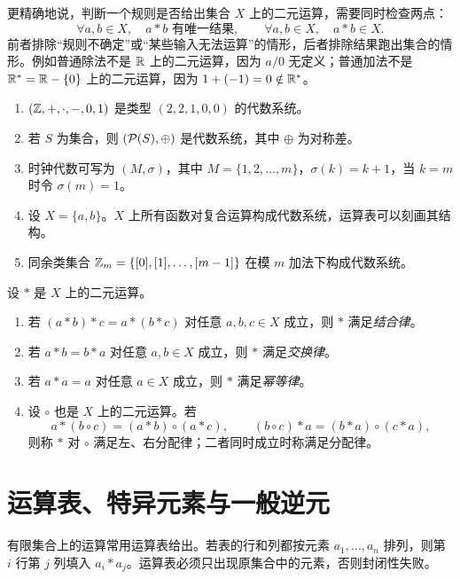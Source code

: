 更精确地说，判断一个规则是否给出集合 $X$ 上的二元运算，需要同时检查两点：
\[
\forall a,b\in X,\quad a*b \text{ 有唯一结果},
\qquad
\forall a,b\in X,\quad a*b\in X.
\]
前者排除“规则不确定”或“某些输入无法运算”的情形，后者排除结果跑出集合的情形。例如普通除法不是 $\mathbb{R}$ 上的二元运算，因为 $a/0$ 无定义；普通加法不是 $\mathbb{R}^\ast=\mathbb{R}-\{0\}$ 上的二元运算，因为 $1+(-1)=0\notin\mathbb{R}^\ast$。

\begin{example}[title={基本模型}]\label{algebra-examples}
  \begin{enumerate}
    \item $(\mathbb{Z},+,\cdot,-,0,1)$ 是类型 $(2,2,1,0,0)$ 的代数系统。
    \item 若 $S$ 为集合，则 $(\mathcal P(S),\oplus)$ 是代数系统，其中 $\oplus$ 为对称差。
    \item 时钟代数可写为 $(M,\sigma)$，其中 $M=\{1,2,\ldots,m\}$，$\sigma(k)=k+1$，当 $k=m$ 时令 $\sigma(m)=1$。
    \item 设 $X=\{a,b\}$。$X$ 上所有函数对复合运算构成代数系统，运算表可以刻画其结构。
    \item 同余类集合 $\mathbb{Z}_m=\{[0],[1],\ldots,[m-1]\}$ 在模 $m$ 加法下构成代数系统。
  \end{enumerate}
\end{example}

\begin{definition}[常用运算律]\label{ch07-operation-laws}
  设 $*$ 是 $X$ 上的二元运算。
  \begin{enumerate}
    \item 若 $(a*b)*c=a*(b*c)$ 对任意 $a,b,c\in X$ 成立，则 $*$ 满足\emph{结合律}。
    \item 若 $a*b=b*a$ 对任意 $a,b\in X$ 成立，则 $*$ 满足\emph{交换律}。
    \item 若 $a*a=a$ 对任意 $a\in X$ 成立，则 $*$ 满足\emph{幂等律}。
    \item 设 $\circ$ 也是 $X$ 上的二元运算。若
    \[
    a*(b\circ c)=(a*b)\circ(a*c),\qquad
    (b\circ c)*a=(b*a)\circ(c*a),
    \]
    则称 $*$ 对 $\circ$ 满足左、右分配律；二者同时成立时称满足分配律。
  \end{enumerate}
\end{definition}

\section{运算表、特异元素与一般逆元}

有限集合上的运算常用运算表给出。若表的行和列都按元素 $a_1,\ldots,a_n$ 排列，则第 $i$ 行第 $j$ 列填入 $a_i*a_j$。运算表必须只出现原集合中的元素，否则封闭性失败。

